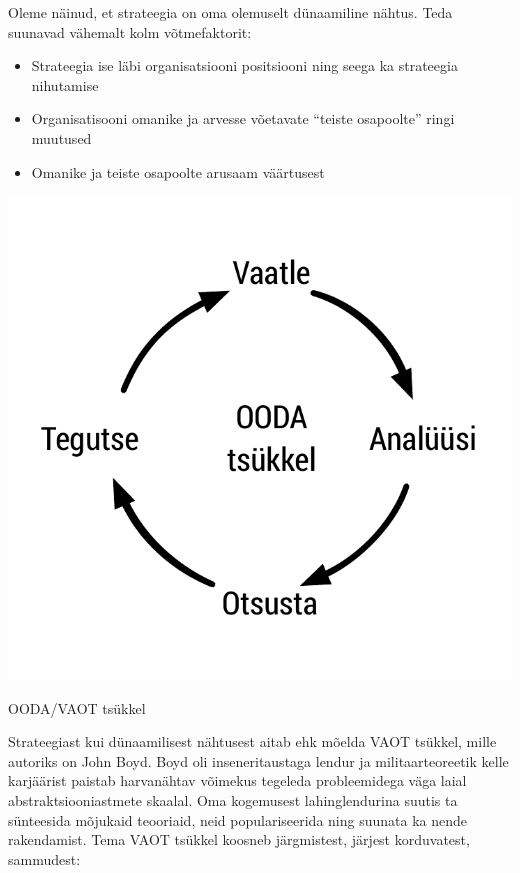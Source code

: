 \documentclass{tufte-book}
\begin{document}
Oleme näinud, et strateegia on oma olemuselt dünaamiline nähtus. Teda suunavad vähemalt kolm võtmefaktorit:
\begin{itemize}
	\item Strateegia ise läbi organisatsiooni positsiooni ning seega ka strateegia nihutamise
	\item Organisatisooni omanike ja arvesse võetavate \enquote{teiste osapoolte} ringi muutused
	\item Omanike ja teiste osapoolte arusaam väärtusest
\end{itemize}
\begin{marginfigure}
	\begin{center}
		\includegraphics[width=\linewidth]{ooda.pdf}
		\caption{OODA/VAOT tsükkel}
		\label{fig:ooda}
	\end{center}
\end{marginfigure}

Strateegiast kui dünaamilisest nähtusest aitab ehk mõelda VAOT tsükkel, mille autoriks on John Boyd. Boyd oli inseneritaustaga lendur ja militaarteoreetik kelle karjäärist paistab harvanähtav võimekus tegeleda probleemidega väga laial abstraktsiooniastmete skaalal. Oma kogemusest lahinglendurina suutis ta sünteesida mõjukaid teooriaid, neid populariseerida ning suunata ka nende  rakendamist. Tema VAOT tsükkel koosneb järgmistest, järjest korduvatest, sammudest:
\end{document}
